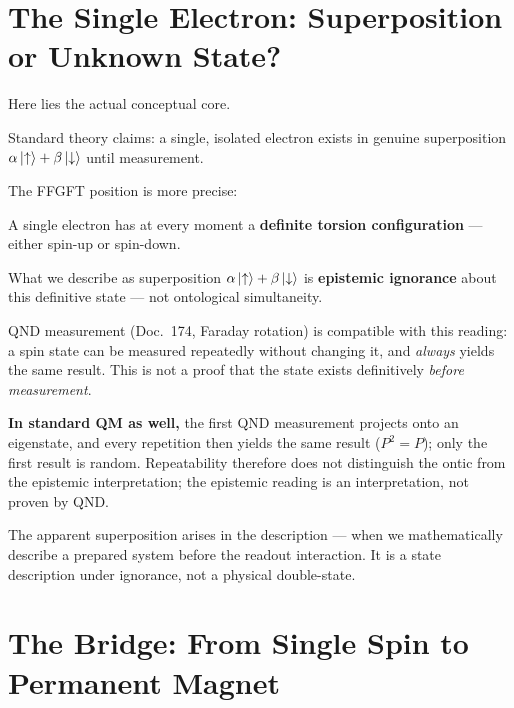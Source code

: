 \section{The Single Electron: Superposition or Unknown State?}
\label{sec:single-electron}

Here lies the actual conceptual core.

Standard theory claims: a single, isolated electron
exists in genuine superposition
$\alpha\left|\uparrow\right\rangle + \beta\left|\downarrow\right\rangle$
until measurement.

The FFGFT position is more precise:

\begin{foundation}
A single electron has at every moment a
\textbf{definite torsion configuration} ---
either spin-up or spin-down.

What we describe as superposition $\alpha\left|\uparrow\right\rangle + \beta\left|\downarrow\right\rangle$
is \textbf{epistemic ignorance} about this
definitive state --- not ontological simultaneity.

QND measurement (Doc.~174,
Faraday rotation) is compatible with this reading: a spin state
can be measured repeatedly without changing it, and \emph{always}
yields the same result. This is not a proof that the state exists
definitively \emph{before measurement}.

\textbf{In standard QM as well,} the first QND measurement projects
onto an eigenstate, and every repetition then yields the same
result ($P^2 = P$); only the first result is random.
Repeatability therefore does not distinguish the ontic from the
epistemic interpretation; the epistemic reading is an
interpretation, not proven by QND.
\end{foundation}

The apparent superposition arises in the description ---
when we mathematically describe a prepared system before
the readout interaction.
It is a state description under ignorance,
not a physical double-state.

\section{The Bridge: From Single Spin to Permanent Magnet}
\label{sec:bridge}

